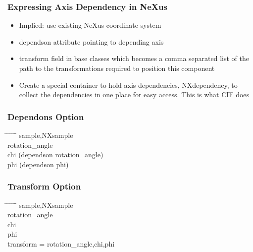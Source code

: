 \documentclass{beamer}
\begin{document}
\begin{frame} \frametitle{Expressing Axis Dependency in NeXus}
\begin{itemize}
\item Implied: use existing NeXus coordinate system
\item dependson attribute pointing to depending axis
\item transform field in base classes which becomes a comma separated list of 
 the path to the transformations required to position this component
\item Create a special container to hold axis dependencies, NXdependency, to 
 collect the dependencies in one place for easy access. This is what CIF does
\end{itemize}
\end{frame}

\begin{frame} \frametitle{Dependons Option}
\begin{tabbing}
\hspace*{1cm} \= \hspace*{1cm} \= \hspace*{1cm} \= \hspace*{1cm} \= \hspace*{1cm} \= \hspace*{1cm}\= \kill
\>sample,NXsample\\
\> \>rotation\_angle\\
\> \>chi (dependson rotation\_angle)\\
\> \>phi (dependson phi)\\
\end{tabbing}
\end{frame}

\begin{frame} \frametitle{Transform Option}
\begin{tabbing}
\hspace*{1cm} \= \hspace*{1cm} \= \hspace*{1cm} \= \hspace*{1cm} \= \hspace*{1cm} \= \hspace*{1cm}\= \kill
\>sample,NXsample\\
\> \>rotation\_angle\\
\> \>chi \\
\> \>phi \\
\> \>transform = rotation\_angle,chi,phi \\
\end{tabbing}
\end{frame}
\end{document}

